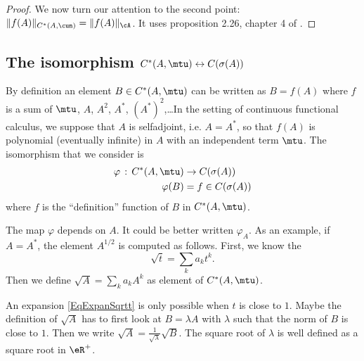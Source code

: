 \begin{proof}
	We now turn our attention to the second point: $\| f(A) \|_{C^*(A,\cun)}=\| f(A) \|_{\cA}$. It uses proposition 2.26, chapter 4 of \cite{LaHarpe}.

\end{proof}

\subsection{The isomorphism \texorpdfstring{$C^*(A,\mtu)\leftrightarrow C(\sigma(A))$}{AAm AsA}}

By definition an element $B\in C^*(A,\mtu)$ can be written as $B=f(A)$ where $f$ is a sum of $\mtu$, $A$, $A^2$, $A^*$, $(A^*)^2$,\ldots In the setting of continuous functional calculus, we suppose that $A$ is selfadjoint, i.e. $A=A^*$, so that $f(A)$ is polynomial (eventually infinite) in $A$ with an independent term $\mtu$. The isomorphism that we consider is
\begin{equation}
	\begin{aligned}
		\varphi\,:\,C^*(A,\mtu) & \to C(\sigma(A))   \\
		\varphi(B)              & =f\in C(\sigma(A))
	\end{aligned}
\end{equation}
where $f$ is the ``definition'' function of $B$ in $C^*(A,\mtu)$.

\begin{remark}      \label{RemExpansionSqrtConCal}
	The map $\varphi$ depends on $A$. It could be better written $\varphi_A$. As an example, if $A=A^*$, the element $A^{1/2}$ is computed as follows. First, we know the 
	\begin{equation}        \label{EqExpanSqrtt}
		\sqrt{t}=\sum_ka_kt^k.
	\end{equation}
	Then we define $\sqrt{A}=\sum_k a_kA^k$ as element of $C^*(A,\mtu)$.
\end{remark}

\begin{probleme}
	An expansion \eqref{EqExpanSqrtt} is only possible when $t$ is close to $1$. Maybe the definition of $\sqrt{A}$ has to first look at $B=\lambda A$ with $\lambda$ such that the norm of $B$ is close to $1$. Then we write $\sqrt{A}=\frac{1}{ \sqrt{\lambda} }\sqrt{B}$. The square root of $\lambda$ is well defined as a square root in $\eR^+$.
\end{probleme}


